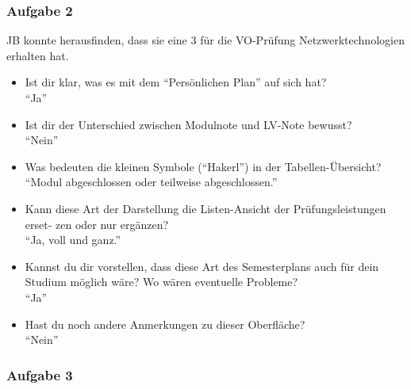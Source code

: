\documentclass[a4paper,10pt]{scrartcl}
\begin{document}
\subsubsection*{Aufgabe 2}

JB konnte herausfinden, dass sie eine 3 für die VO-Prüfung Netzwerktechnologien erhalten hat.

\begin{itemize}

\item  Ist dir klar, was es mit dem “Persönlichen Plan” auf sich hat? \\

``Ja''\\

\item  Ist dir der Unterschied zwischen Modulnote und LV-Note bewusst? \\

``Nein''\\

\item  Was bedeuten die kleinen Symbole (“Hakerl”) in der Tabellen-Übersicht? \\

``Modul abgeschlossen oder teilweise abgeschlossen.''\\

\item  Kann diese Art der Darstellung die Listen-Ansicht der Prüfungsleistungen erset-
zen oder nur ergänzen? \\

``Ja, voll und ganz.''\\

\item  Kannst du dir vorstellen, dass diese Art des Semesterplans auch für dein Studium
möglich wäre? Wo wären eventuelle Probleme? \\

``Ja''\\

\item  Hast du noch andere Anmerkungen zu dieser Oberfläche? \\

``Nein''\\

\end{itemize}

\subsubsection*{Aufgabe 3}
\end{document}

